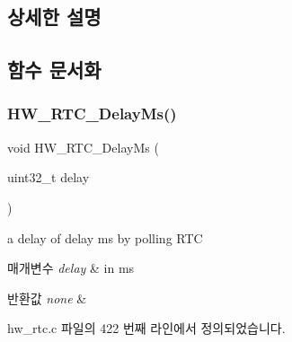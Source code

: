 \subsection{상세한 설명}


\subsection{함수 문서화}
\mbox{\label{group___lory_s_d_k___r_t_c___functions_gadad8cbf36cbe8a65bc1c70109146e307}} 
\subsubsection{\texorpdfstring{H\+W\+\_\+\+R\+T\+C\+\_\+\+Delay\+Ms()}{HW\_RTC\_DelayMs()}}
{\footnotesize\ttfamily void H\+W\+\_\+\+R\+T\+C\+\_\+\+Delay\+Ms (\begin{DoxyParamCaption}\item[{uint32\+\_\+t}]{delay }\end{DoxyParamCaption})}



a delay of delay ms by polling R\+TC 


\begin{DoxyParams}{매개변수}
{\em delay} & in ms \\
\hline
\end{DoxyParams}

\begin{DoxyRetVals}{반환값}
{\em none} & \\
\hline
\end{DoxyRetVals}


hw\+\_\+rtc.\+c 파일의 422 번째 라인에서 정의되었습니다.



